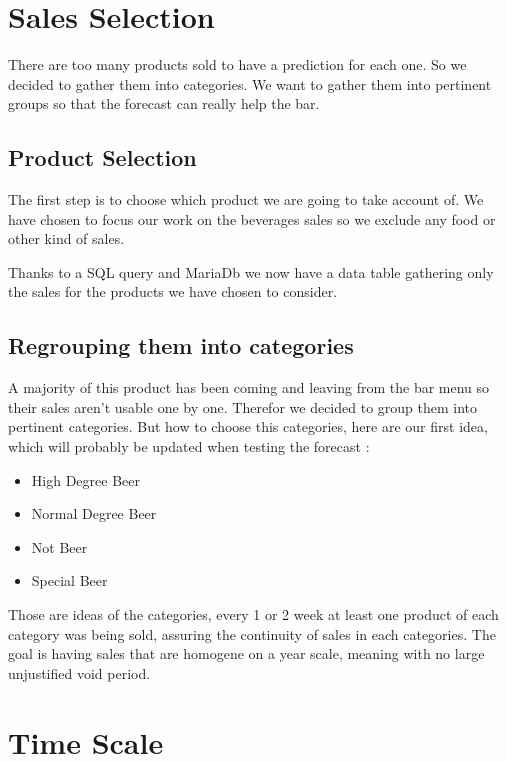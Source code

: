 \documentclass{report}
\begin{document}
\section{Sales Selection}

There are too many products sold to have a prediction for each one. So we decided to gather them into categories. We want to gather them into pertinent groups so that the forecast can really help the bar. 

\subsection{Product Selection}

The first step is to choose which product we are going to take account of. We have chosen to focus our work on the beverages sales so we exclude any food or other kind of sales. 

Thanks to a SQL query and MariaDb we now have a data table gathering only the sales for the products we have chosen to consider.

\subsection{Regrouping them into categories}

A majority of this product has been coming and leaving from the bar menu so their sales aren't usable one by one. Therefor we decided to group them into pertinent categories. But how to choose this categories, here are our first idea, which will probably be updated when testing the forecast :

\begin{itemize}
\item High Degree Beer
\item Normal Degree Beer
\item Not Beer
\item Special Beer
\end{itemize}

Those are ideas of the categories, every 1 or 2 week at least one product of each category was being sold, assuring the continuity of sales in each categories. The goal is having sales that are homogene on a year scale, meaning with no large unjustified void period.


\section{Time Scale}
\end{document}
